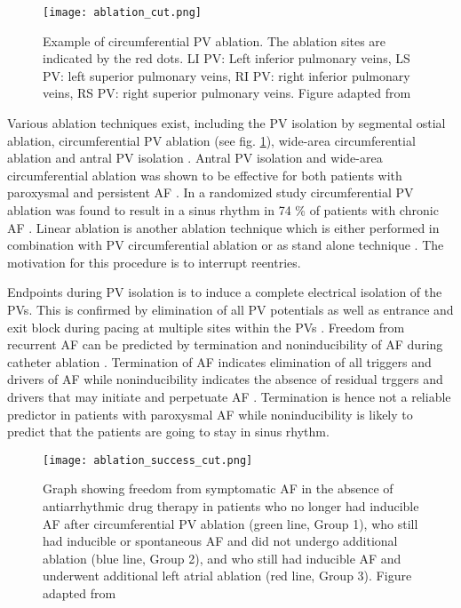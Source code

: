 \documentclass[type=dr, dr=rernat, accentcolor=tud7b,colorbacktitle, bigchapter, openright, twoside, 12pt ]{tudthesis}
\begin{document}
\begin{figure}[H]
\begin{center}
\texttt{[image: ablation\_cut.png]}
\caption{Example of circumferential PV ablation. The ablation sites are indicated by the red dots. LI PV: Left inferior pulmonary veins, 
LS PV: left superior pulmonary veins, RI PV: right inferior pulmonary veins, RS PV: right superior pulmonary veins. Figure adapted 
from \cite{Ora06}}
\label{af_circ}
\end{center}
\end{figure}

Various ablation techniques exist, including the PV isolation by segmental ostial ablation, circumferential PV ablation (see 
fig. \ref{af_circ}), wide-area circumferential ablation and antral PV isolation \cite{Ora06} \cite{Ora03} \cite{Ouy04}. Antral PV isolation 
and wide-area circumferential ablation was shown to be effective for both patients with paroxysmal and persistent AF \cite{CE09} \cite{Ora03}. 
In a randomized study circumferential PV ablation was found to result in a sinus rhythm in 74 \% of patients with chronic AF \cite{Ora06}. 
Linear ablation is another ablation technique which is either performed in combination with PV circumferential ablation or as stand alone 
technique \cite{CE09}. The motivation for this procedure is to interrupt reentries.


Endpoints during PV isolation is to induce a complete electrical isolation of the PVs. This is confirmed by elimination of all PV potentials 
as well as entrance and exit block during pacing at multiple sites within the PVs \cite{CE09}. Freedom from recurrent AF can be predicted by 
termination and noninducibility of AF during catheter ablation \cite{Ora02} \cite{Ora06} \cite{Hai05} \cite{Hai04} \cite{Ora04}. Termination 
of AF indicates elimination of all triggers and drivers of AF while noninducibility indicates the absence of residual trggers and drivers 
that may initiate and perpetuate AF \cite{CE09}. Termination is hence not a reliable predictor in patients with paroxysmal AF while 
noninducibility is likely to predict that the patients are going to stay in sinus rhythm. 

\begin{figure}[H]
\begin{center}
\texttt{[image: ablation\_success\_cut.png]}
\caption{Graph showing freedom from symptomatic AF in the absence of antiarrhythmic drug therapy in patients who no longer had inducible AF 
after circumferential PV ablation (green line, Group 1), who still had inducible or spontaneous AF and did not undergo additional ablation 
(blue line, Group 2), and who still had inducible AF and underwent additional left atrial ablation (red line, Group 3). Figure adapted 
from \cite{Ora04}}
\end{center}
\end{figure}
\end{document}
